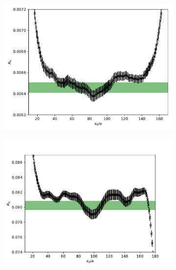 \begin{figure}
\begin{subfigure}{.49\textwidth}
    	\caption{}
    \end{subfigure}
    \begin{subfigure}{.49\textwidth}
    	\includegraphics[width=\textwidth]{./cap3/figs/J501_R.pdf}
    	\caption{}
    \end{subfigure}
    \begin{subfigure}{.49\textwidth}
    	\includegraphics[width=\textwidth]{./cap3/figs/J501_R_tm.pdf}
    	\caption{}
    \end{subfigure}
    \begin{subfigure}{.49\textwidth}

\end{subfigure}
\end{figure}
